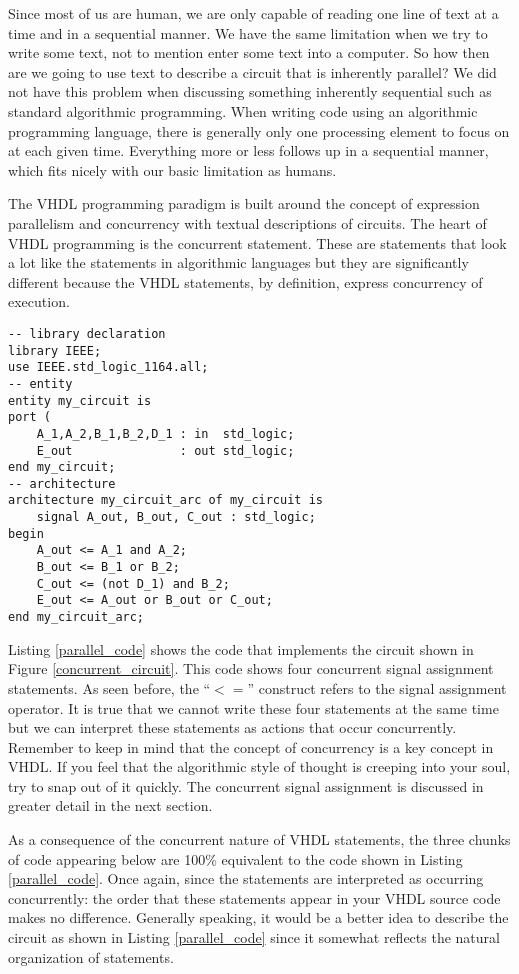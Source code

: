 Since most of us are human, we are only capable of reading one line of text at a time and in a sequential manner. We have the same limitation when we try to write some text, not to mention enter some text into a computer. So how then are we going to use text to describe a circuit that is inherently parallel? We did not have this problem when discussing something inherently sequential such as standard algorithmic programming. When writing code using an algorithmic programming language, there is generally only one processing element to focus on at each given time. Everything more or less follows up in a sequential manner, which fits nicely with our basic limitation as humans. 

The VHDL programming paradigm is built around the concept of expression parallelism and concurrency with textual descriptions of circuits. The heart of VHDL programming is the concurrent statement. These are statements that look a lot like the statements in algorithmic languages but they are significantly different because the VHDL statements, by definition, express concurrency of execution.

\begin{lstlisting}[float, label=parallel_code, caption=VHDL code for the circuit of Figure 4.1.]
-- library declaration
library IEEE;
use IEEE.std_logic_1164.all;
-- entity
entity my_circuit is
port ( 
	A_1,A_2,B_1,B_2,D_1	: in  std_logic;
	E_out				: out std_logic;
end my_circuit;
-- architecture
architecture my_circuit_arc of my_circuit is
	signal A_out, B_out, C_out : std_logic;
begin
	A_out <= A_1 and A_2;   
	B_out <= B_1 or B_2; 
	C_out <= (not D_1) and B_2; 
	E_out <= A_out or B_out or C_out;
end my_circuit_arc;
\end{lstlisting}

Listing \ref{parallel_code} shows the code that implements the circuit shown in Figure \ref{concurrent_circuit}. This code shows four concurrent signal assignment statements. As seen before, the ``$<=$'' construct refers to the signal assignment operator. It is true that we cannot write these four statements at the same time but we can interpret these statements as actions that occur concurrently. Remember to keep in mind that the concept of concurrency is a key concept in VHDL. If you feel that the algorithmic style of thought is creeping into your soul, try to snap out of it quickly. The concurrent signal assignment is discussed in greater detail in the next section. 

As a consequence of the concurrent nature of VHDL statements, the three chunks of code appearing below are 100\% equivalent to the code shown in Listing \ref{parallel_code}. Once again, since the statements are interpreted as occurring concurrently: the order that these statements appear in your VHDL source code makes no difference. Generally speaking, it would be a better idea to describe the circuit as shown in Listing \ref{parallel_code} since it somewhat reflects the natural organization of statements.

